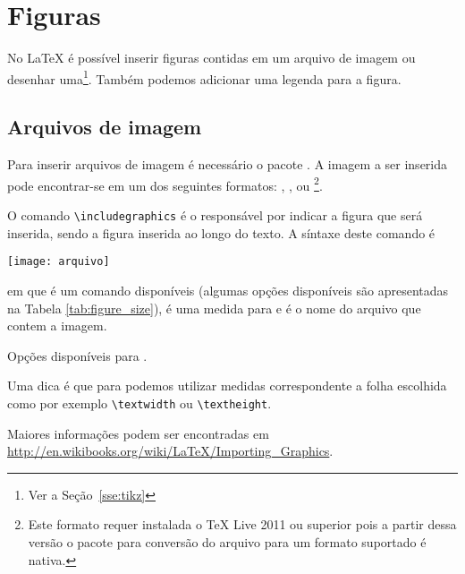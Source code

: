 \section{Figuras}
No LaTeX é possível inserir figuras contidas em um arquivo de
imagem ou desenhar uma\footnote{Ver a Seção~\ref{sse:tikz}}. Também podemos
adicionar uma legenda para a figura.

\subsection{Arquivos de imagem}
Para inserir arquivos de imagem é necessário o pacote
. A imagem a ser
inserida pode encontrar-se em um dos seguintes formatos: ,
,  ou \footnote{Este formato requer instalada o
TeX Live 2011 ou superior pois a partir dessa versão o pacote para conversão do
arquivo  para um formato suportado é nativa.}.

O comando
\lstinline!\includegraphics!
é o responsável por indicar a figura que será inserida, sendo a figura inserida
ao longo do texto. A síntaxe deste comando é
\begin{code}
  \texttt{[image: arquivo]}
\end{code}
em que  é um comando disponíveis (algumas opções disponíveis
são apresentadas na Tabela \ref{tab:figure_size}),  é uma medida
para  e  é o nome do arquivo que contem a imagem.
\begin{table}[!htb]
  \centering
  \caption{Opções disponíveis para .}
  \label{tab:figure_size}
  
\end{table}

Uma dica é que para  podemos utilizar medidas correspondente a
folha escolhida como por exemplo \lstinline!\textwidth! ou
\lstinline!\textheight!.\\

Maiores informações podem ser encontradas em
\url{http://en.wikibooks.org/wiki/LaTeX/Importing_Graphics}.

